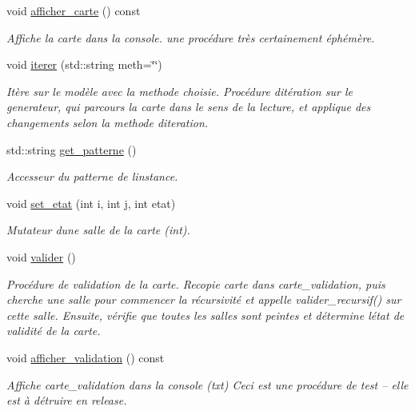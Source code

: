 \begin{DoxyCompactItemize}
void \hyperlink{classZoneGen_a79aa554fa5bee5bd1e0af2a1a505fa57}{afficher\+\_\+carte} () const 
\begin{DoxyCompactList}\small\item\em Affiche la carte dans la console. une procédure très certainement éphémère. \end{DoxyCompactList}\item 
void \hyperlink{classZoneGen_a63dfaff24d4686702b22937606da1e04}{iterer} (std\+::string meth=\char`\"{}\char`\"{})
\begin{DoxyCompactList}\small\item\em Itère sur le modèle avec la {\itshape methode} choisie. Procédure d\textquotesingle{}itération sur le generateur, qui parcours la {\itshape carte} dans le sens de la lecture, et applique des changements selon la {\itshape methode} d\textquotesingle{}iteration. \end{DoxyCompactList}\item 
std\+::string \hyperlink{classZoneGen_ab1d84dcb2654e8339cd325cf15fcf9ca}{get\+\_\+patterne} ()
\begin{DoxyCompactList}\small\item\em Accesseur du {\itshape patterne} de l\textquotesingle{}instance. \end{DoxyCompactList}\item 
void \hyperlink{classZoneGen_a6b87a471d137c8db268ffc2df0425c81}{set\+\_\+etat} (int i, int j, int etat)
\begin{DoxyCompactList}\small\item\em Mutateur d\textquotesingle{}une \textquotesingle{}salle\textquotesingle{} de la {\itshape carte} (int). \end{DoxyCompactList}\item 
void \hyperlink{classZoneGen_ad0f167f538f4e9f3e12908421297250f}{valider} ()
\begin{DoxyCompactList}\small\item\em Procédure de validation de la {\itshape carte}. Recopie {\itshape carte} dans {\itshape carte\+\_\+validation}, puis cherche une salle pour commencer la récursivité et appelle valider\+\_\+recursif() sur cette salle. Ensuite, vérifie que toutes les salles sont peintes et détermine l\textquotesingle{}état de validité de la {\itshape carte}. \end{DoxyCompactList}\item 
void \hyperlink{classZoneGen_a57bde599d7912da9ee574d5f94c3ea48}{afficher\+\_\+validation} () const 
\begin{DoxyCompactList}\small\item\em Affiche {\itshape carte\+\_\+validation} dans la console (txt) Ceci est une procédure de test -- elle est à détruire en release. \end{DoxyCompactList}\item 

\end{DoxyCompactItemize}
